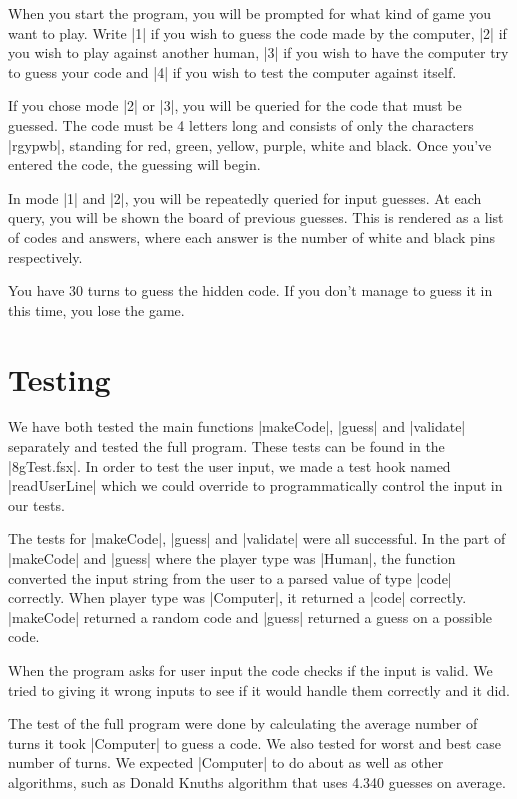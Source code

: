 \documentclass[a4paper]{article}
\begin{document}
When you start the program, you will be prompted for what kind of game you want to play. Write \code|1| if you wish to guess the code made by the computer, \code|2| if you wish to play against another human, \code|3| if you wish to have the computer try to guess your code and \code|4| if you wish to test the computer against itself.

If you chose mode \code|2| or \code|3|, you will be queried for the code that must be guessed. The code must be 4 letters long and consists of only the characters \code|rgypwb|, standing for red, green, yellow, purple, white and black. Once you've entered the code, the guessing will begin.

In mode \code|1| and \code|2|, you will be repeatedly queried for input guesses. At each query, you will be shown the board of previous guesses. This is rendered as a list of codes and answers, where each answer is the number of white and black pins respectively.

You have 30 turns to guess the hidden code. If you don't manage to guess it in this time, you lose the game.

\section{Testing}

We have both tested the main functions \code|makeCode|, \code|guess| and \code|validate| separately and tested the full program. These tests can be found in the \code|8gTest.fsx|. In order to test the user input, we made a test hook named \code|readUserLine| which we could override to programmatically control the input in our tests.

The tests for \code|makeCode|, \code|guess| and \code|validate| were all successful. In the part of \code|makeCode| and \code|guess| where the player type was \code|Human|, the function converted the input string from the user to a parsed value of type \code|code| correctly. When player type was \code|Computer|, it returned a \code|code| correctly. \code|makeCode| returned a random code and \code|guess| returned a guess on a possible code.

When the program asks for user input the code checks if the input is valid. We tried to giving it wrong inputs to see if it would handle them correctly and it did.

The test of the full program were done by calculating the average number of turns it took \code|Computer| to guess a code. We also tested for worst and best case number of turns. We expected \code|Computer| to do about as well as other algorithms, such as Donald Knuths algorithm that uses 4.340 guesses on average.
\end{document}
